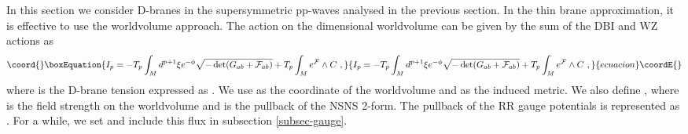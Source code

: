 \documentclass[a4paper,12pt]{article}
\numberwithin{equation}{section}
\begin{document}
In this section we consider D-branes in the supersymmetric pp-waves
analysed in the previous section.
In the thin brane approximation, it is effective to use the worldvolume
approach.
The action on the \coordHE{} dimensional worldvolume can be given by the sum of
the DBI and WZ actions as
\begin{equation}\coord{}\boxEquation{
 I_p = - T_{p} \int _M d^{p+1} \xi
  e^{-\phi} \sqrt{-\det(G_{ab} + {\cal F}_{ab})} 
       + T_{p} \int _M e^{\cal F} \wedge C ~, 
}{
 I_p = - T_{p} \int _M d^{p+1} \xi
  e^{-\phi} \sqrt{-\det(G_{ab} + {\cal F}_{ab})} 
       + T_{p} \int _M e^{\cal F} \wedge C ~, 
}{ecuacion}\coordE{}\end{equation}
where \coordHE{} is the D\coordHE{}-brane tension expressed as 
\coordHE{}.
We use \coordHE{}  \coordHE{} as the coordinate of the worldvolume and
\coordHE{} as the induced metric. We also define
\coordHE{}, where
\coordHE{} is the field strength on the worldvolume and \coordHE{} is the pullback of
the NSNS 2-form. The pullback of the RR gauge potentials is represented
as \coordHE{}.
For a while, we set \coordHE{} and include this flux in subsection 
\ref{subsec-gauge}.
\end{document}
